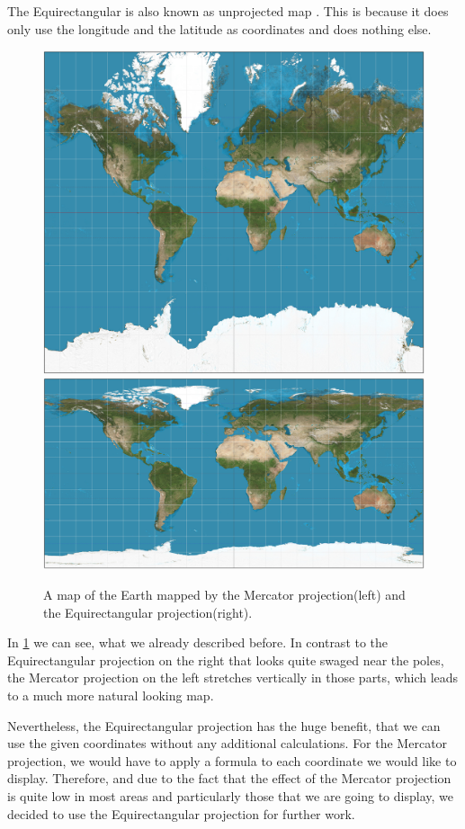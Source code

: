 \documentclass
[
    paper = a4,
    pagesize,
    12 pt,
    oneside,                       %
    open = right,
    DIV = calc,
    BCOR = 0 mm,                   %
    bibtotoc
]
{scrbook}
\begin{document}
The Equirectangular is also known as unprojected map
.
This is because it does only use the longitude and the latitude as coordinates and does nothing else.

\begin{figure}[H]
    \includegraphics[width=.5\textwidth]{Images/Mercator_projection_SW.jpg}
    \includegraphics[width=.5\textwidth]{Images/Equirectangular_projection_SW.jpg}
\caption[]{A map of the Earth mapped by the Mercator projection(left) and the Equirectangular projection(right).}
\label{fig:projections}
\end{figure}

In \cref{fig:projections} we can see, what we already described before.
In contrast to the Equirectangular projection on the right that looks quite swaged near the poles, the Mercator projection on the left stretches vertically in those parts, which leads to a much more natural looking map.

Nevertheless, the Equirectangular projection has the huge benefit, that we can use the given coordinates without any additional calculations.
For the Mercator projection, we would have to apply a formula to each coordinate we would like to display.
Therefore, and due to the fact that the effect of the Mercator projection is quite low in most areas and particularly those that we are going to display, we decided to use the Equirectangular projection for further work.
\end{document}
